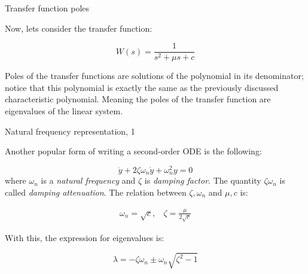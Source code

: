 \documentclass{beamer}
\begin{document}
\begin{frame}{Transfer function poles}
	\begin{flushleft}
		
		Now, lets consider the transfer function:
		
		\begin{equation}
			W(s) = \frac{1}{s^2 + \mu s + c }
		\end{equation}
		
		Poles of the transfer functions are solutions of the polynomial in its denominator; notice that this polynomial is exactly the same as the previously discussed characteristic polynomial. Meaning the poles of the transfer function are eigenvalues of the linear system.
		
		
	\end{flushleft}
\end{frame}



\begin{frame}{Natural frequency representation, 1}
	\begin{flushleft}
		
		Another popular form of writing a second-order ODE is the following:
		
		\begin{equation}
			\ddot y + 2 \zeta \omega_n \dot y + \omega_n^2 y = 0
		\end{equation}
		where $\omega_n$ is a \emph{natural frequency} and $\zeta$ is \emph{damping factor}. The quantity $\zeta \omega_n$ is called \emph{damping attenuation}. The relation between $\zeta, \omega_n$ and $\mu, c$ is:
		
		\begin{align}
			\omega_n = \sqrt{c},  \ \ \ \ \zeta = \frac{\mu}{2\sqrt{c}}
		\end{align}
	
		With this, the expression for eigenvalues is:
		
		\begin{equation}
			\lambda = -\zeta \omega_n \pm \omega_n \sqrt{\zeta^2 - 1}
		\end{equation}
		
	\end{flushleft}
\end{frame}
\end{document}
